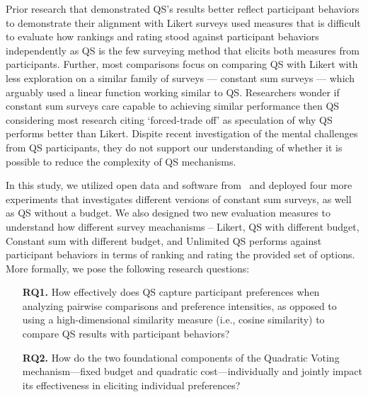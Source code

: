 Prior research that demonstrated QS's results better reflect participant behaviors to demonstrate their alignment with Likert surveys used measures that is difficult to evaluate how rankings and rating stood against participant behaviors independently as QS is the few surveying method that elicits both measures from participants. Further, most comparisons focus on comparing QS with Likert with less exploration on a similar family of surveys --- constant sum surveys --- which arguably used a linear function working similar to QS. Researchers wonder if constant sum surveys care capable to achieving similar performance then QS considering most research citing `forced-trade off' as speculation of why QS performs better than Likert. Dispite recent investigation of the mental challenges from QS participants, they do not support our understanding of whether it is possible to reduce the complexity of QS mechanisms.


In this study, we utilized open data and software from~\citet{chengCanShowWhat2021} and deployed four more experiments that investigates different versions of constant sum surveys, as well as QS without a budget. We also designed two new evaluation measures to understand how different survey meachanisms -- Likert, QS with different budget, Constant sum with different budget, and Unlimited QS performs against participant behaviors in terms of ranking and rating the provided set of options. More formally, we pose the following research questions:
\begin{itemize}
    \item [\textbf{RQ1.}] How effectively does QS capture participant preferences when analyzing pairwise comparisons and preference intensities, as opposed to using a high-dimensional similarity measure (i.e., cosine similarity) to compare QS results with participant behaviors?
    \item [\textbf{RQ2.}] How do the two foundational components of the Quadratic Voting mechanism---fixed budget and quadratic cost---individually and jointly impact its effectiveness in eliciting individual preferences?
\end{itemize}

